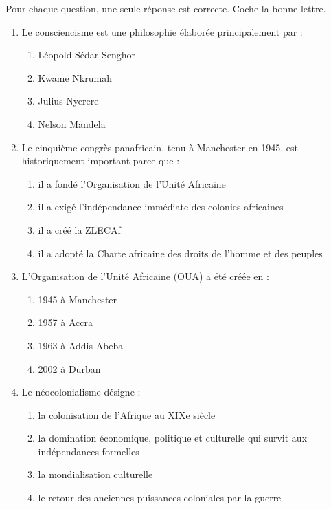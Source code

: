 \documentclass[11pt]{article}
\begin{document}
\begin{exercice}
Pour chaque question, une seule réponse est correcte. Coche la bonne lettre.

\begin{enumerate}
\item Le consciencisme est une philosophie élaborée principalement par :
\begin{enumerate}
\item Léopold Sédar Senghor
\item Kwame Nkrumah
\item Julius Nyerere
\item Nelson Mandela
\end{enumerate}

\item Le cinquième congrès panafricain, tenu à Manchester en 1945, est historiquement important parce que :
\begin{enumerate}
\item il a fondé l'Organisation de l'Unité Africaine
\item il a exigé l'indépendance immédiate des colonies africaines
\item il a créé la ZLECAf
\item il a adopté la Charte africaine des droits de l'homme et des peuples
\end{enumerate}

\item L'Organisation de l'Unité Africaine (OUA) a été créée en :
\begin{enumerate}
\item 1945 à Manchester
\item 1957 à Accra
\item 1963 à Addis-Abeba
\item 2002 à Durban
\end{enumerate}

\item Le néocolonialisme désigne :
\begin{enumerate}
\item la colonisation de l'Afrique au XIXe siècle
\item la domination économique, politique et culturelle qui survit aux indépendances formelles
\item la mondialisation culturelle
\item le retour des anciennes puissances coloniales par la guerre
\end{enumerate}
\end{enumerate}
\end{exercice}
\end{document}
